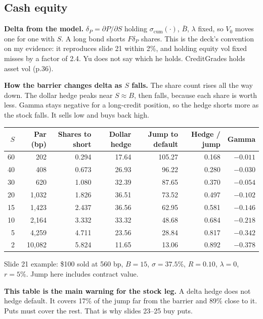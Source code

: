 \documentclass[10pt,a4paper]{article}
\newcommand{\Bbar}{\bar{B}}
\newcommand{\scum}{\sigma_{\mathrm{cum}}}
\begin{document}
\subsection{Cash equity}\label{sec:equity}

\textbf{Delta from the model.} $\delta_P=\partial P/\partial S$ holding $\scum(\cdot)$, $\Bbar$, $\lambda$ fixed, so $V_0$ moves one for one with $S$. A long bond shorts $F\delta_P$ shares. This is the deck's convention on my evidence: it reproduces slide 21 within 2\%, and holding equity vol fixed misses by a factor of 2.4. Yu does not say which he holds. CreditGrades holds asset vol (p.36).

\textbf{How the barrier changes delta as $S$ falls.} The share count rises all the way down. The dollar hedge peaks near $S\approx B$, then falls, because each share is worth less. Gamma stays negative for a long-credit position, so the hedge shorts more as the stock falls. It sells low and buys back high.

\begin{center}
\footnotesize
\begin{tabular}{@{}rrrrrrr@{}}
\toprule
$S$ & Par (bp) & Shares to short & Dollar hedge & Jump to default & Hedge / jump & Gamma\\
\midrule
60 & 202 & 0.294 & 17.64 & 105.27 & 0.168 & $-0.011$\\
40 & 408 & 0.673 & 26.93 & 96.22 & 0.280 & $-0.030$\\
30 & 620 & 1.080 & 32.39 & 87.65 & 0.370 & $-0.054$\\
20 & 1,032 & 1.826 & 36.51 & 73.52 & 0.497 & $-0.102$\\
15 & 1,423 & 2.437 & 36.56 & 62.95 & 0.581 & $-0.146$\\
10 & 2,164 & 3.332 & 33.32 & 48.68 & 0.684 & $-0.218$\\
5 & 4,259 & 4.711 & 23.56 & 28.84 & 0.817 & $-0.342$\\
2 & 10,082 & 5.824 & 11.65 & 13.06 & 0.892 & $-0.378$\\
\bottomrule
\end{tabular}

\smallskip
Slide 21 example: \$100 sold at 560 bp, $B=15$, $\sigma=37.5\%$, $R=0.10$, $\lambda=0$, $r=5\%$. Jump here includes contract value.
\end{center}

\textbf{This table is the main warning for the stock leg.} A delta hedge does not hedge default. It covers 17\% of the jump far from the barrier and 89\% close to it. Puts must cover the rest. That is why slides 23--25 buy puts.
\end{document}
